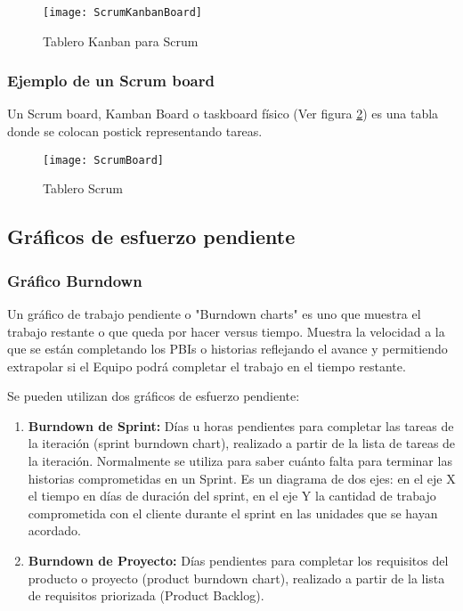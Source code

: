 \begin{figure}[h]
  \centering
  \texttt{[image: ScrumKanbanBoard]}
  \caption{Tablero Kanban para Scrum}
  \centering
  \label{fig:ScrumKanbanBoard} %
\end{figure}

\subsubsection{Ejemplo de un Scrum board}

Un Scrum board, Kamban Board o taskboard físico (Ver figura \ref{fig:ScrumBoard}) es una tabla donde se colocan postick representando tareas.

\begin{figure}[h]
  \centering
  \texttt{[image: ScrumBoard]}
  \caption{Tablero Scrum}
  \centering
  \label{fig:ScrumBoard} %
\end{figure}

\subsection{Gráficos de esfuerzo pendiente}

\subsubsection{Gráfico Burndown}
Un gráfico de trabajo pendiente o "Burndown charts" es uno que muestra el trabajo restante o que queda por hacer versus tiempo. Muestra la velocidad a la que se están completando los PBIs o historias reflejando el avance y permitiendo extrapolar si el Equipo podrá completar el trabajo en el tiempo restante.

Se pueden utilizan dos gráficos de esfuerzo pendiente:

\begin{enumerate}

\item \textbf{Burndown de Sprint:} Días u horas pendientes para completar las tareas de la iteración (sprint burndown chart), realizado a partir de la lista de tareas de la iteración. Normalmente se utiliza para saber cuánto falta para terminar las historias comprometidas en un Sprint. Es un diagrama de dos ejes: en el eje X el tiempo en días de duración del sprint, en el eje Y la cantidad de trabajo comprometida con el cliente durante el sprint en las unidades que se hayan acordado.

\item \textbf{Burndown de Proyecto:} Días pendientes para completar los requisitos del producto o proyecto (product burndown chart), realizado a partir de la lista de requisitos priorizada (Product Backlog).

\end{enumerate}

